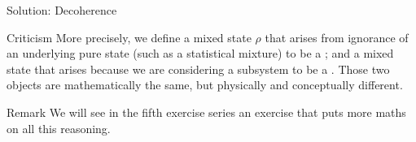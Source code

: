 \documentclass[a4paper]{article}
\begin{document}
\begin{parag}{Solution: Decoherence}
\begin{subparag}{Criticism}
        More precisely, we define a mixed state $\rho$ that arises from ignorance of an underlying pure state (such as a statistical mixture) to be a ; and a mixed state that arises because we are considering a subsystem to be a . Those two objects are mathematically the same, but physically and conceptually different.
    \end{subparag}
        
    \begin{subparag}{Remark}
        We will see in the fifth exercise series an exercise that puts more maths on all this reasoning.
    \end{subparag}
\end{parag}
\end{document}
